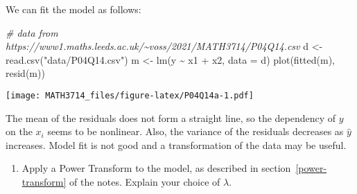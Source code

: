 \documentclass[
  a4paper,
]{article}
\newenvironment{Shaded}{\begin{snugshade}}{\end{snugshade}}
\newcommand{\AttributeTok}[1]{\textcolor[rgb]{0.77,0.63,0.00}{#1}}
\newcommand{\CommentTok}[1]{\textcolor[rgb]{0.56,0.35,0.01}{\textit{#1}}}
\newcommand{\FunctionTok}[1]{\textcolor[rgb]{0.00,0.00,0.00}{#1}}
\newcommand{\NormalTok}[1]{#1}
\newcommand{\OtherTok}[1]{\textcolor[rgb]{0.56,0.35,0.01}{#1}}
\newcommand{\SpecialCharTok}[1]{\textcolor[rgb]{0.00,0.00,0.00}{#1}}
\newcommand{\StringTok}[1]{\textcolor[rgb]{0.31,0.60,0.02}{#1}}
\providecommand{\tightlist}{%
  \setlength{\itemsep}{0pt}\setlength{\parskip}{0pt}}
\theoremstyle{definition}
\theoremstyle{definition}
\theoremstyle{definition}
\theoremstyle{definition}
\theoremstyle{remark}
\begin{document}
\begin{myanswers}
We can fit the model as follows:

\begin{Shaded}
\begin{Highlighting}[]
\CommentTok{\# data from https://www1.maths.leeds.ac.uk/\textasciitilde{}voss/2021/MATH3714/P04Q14.csv}
\NormalTok{d }\OtherTok{\textless{}{-}} \FunctionTok{read.csv}\NormalTok{(}\StringTok{"data/P04Q14.csv"}\NormalTok{)}
\NormalTok{m }\OtherTok{\textless{}{-}} \FunctionTok{lm}\NormalTok{(y }\SpecialCharTok{\textasciitilde{}}\NormalTok{ x1 }\SpecialCharTok{+}\NormalTok{ x2, }\AttributeTok{data =}\NormalTok{ d)}
\FunctionTok{plot}\NormalTok{(}\FunctionTok{fitted}\NormalTok{(m), }\FunctionTok{resid}\NormalTok{(m))}
\end{Highlighting}
\end{Shaded}

\texttt{[image: MATH3714\_files/figure-latex/P04Q14a-1.pdf]}

The mean of the residuals does not form a straight line, so the
dependency of \(y\) on the \(x_i\) seems to be nonlinear. Also, the variance
of the residuals decreases as \(\hat y\) increases. Model fit is not good
and a transformation of the data may be useful.

\end{myanswers}

\begin{enumerate}
\def\labelenumi{\alph{enumi}.}
\setcounter{enumi}{1}
\tightlist
\item
  Apply a Power Transform to the model, as described in
  section~\ref{power-transform} of the notes. Explain your choice of \(\lambda\).
\end{enumerate}
\end{document}
